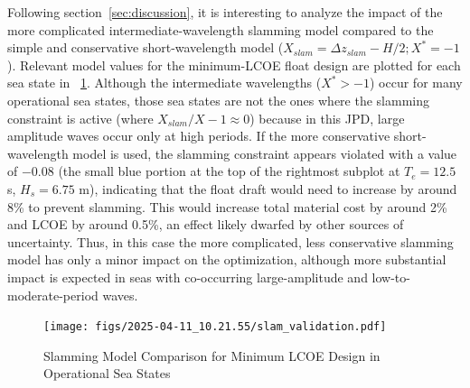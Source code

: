 Following section~\ref{sec:discussion}, it is interesting to analyze the impact of the more complicated intermediate-wavelength slamming model compared to the simple and conservative short-wavelength model ($X_{slam}=\Delta z_{slam}-H/2; X^*=-1$).
Relevant model values for the minimum-LCOE float design are plotted for each sea state in \figureautorefname~\ref{fig:slamming-validation}.
Although the intermediate wavelengths ($X^*>-1$) occur for many operational sea states, those sea states are not the ones where the slamming constraint is active (where $X_{slam}/X-1 \approx 0$) because in this JPD, large amplitude waves occur only at high periods.
If the more conservative short-wavelength model is used, the slamming constraint appears violated with a value of $-0.08$ (the small blue portion at the top of the rightmost subplot at $T_e=12.5$ s, $H_s=6.75$ m), indicating that the float draft would need to increase by around 8\% to prevent slamming.
This would increase total material cost by around 2\% and LCOE by around 0.5\%, an effect likely dwarfed by other sources of uncertainty.
Thus, in this case the more complicated, less conservative slamming model has only a minor impact on the optimization, although more substantial impact is expected in seas with co-occurring large-amplitude and low-to-moderate-period waves. 
\begin{figure}
    \centering
    \texttt{[image: figs/2025-04-11\_10.21.55/slam\_validation.pdf]}
    \caption{Slamming Model Comparison for Minimum LCOE Design in Operational Sea States}
    \label{fig:slamming-validation}
\end{figure}



\clearpage
